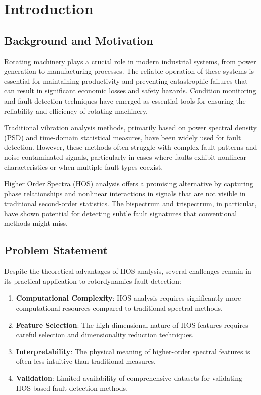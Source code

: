 
\chapter{Introduction}

\section{Background and Motivation}

Rotating machinery plays a crucial role in modern industrial systems, from power generation to manufacturing processes. The reliable operation of these systems is essential for maintaining productivity and preventing catastrophic failures that can result in significant economic losses and safety hazards. Condition monitoring and fault detection techniques have emerged as essential tools for ensuring the reliability and efficiency of rotating machinery.

Traditional vibration analysis methods, primarily based on power spectral density (PSD) and time-domain statistical measures, have been widely used for fault detection. However, these methods often struggle with complex fault patterns and noise-contaminated signals, particularly in cases where faults exhibit nonlinear characteristics or when multiple fault types coexist.

Higher Order Spectra (HOS) analysis offers a promising alternative by capturing phase relationships and nonlinear interactions in signals that are not visible in traditional second-order statistics. The bispectrum and trispectrum, in particular, have shown potential for detecting subtle fault signatures that conventional methods might miss.

\section{Problem Statement}

Despite the theoretical advantages of HOS analysis, several challenges remain in its practical application to rotordynamics fault detection:

\begin{enumerate}
    \item \textbf{Computational Complexity}: HOS analysis requires significantly more computational resources compared to traditional spectral methods.
    \item \textbf{Feature Selection}: The high-dimensional nature of HOS features requires careful selection and dimensionality reduction techniques.
    \item \textbf{Interpretability}: The physical meaning of higher-order spectral features is often less intuitive than traditional measures.
    \item \textbf{Validation}: Limited availability of comprehensive datasets for validating HOS-based fault detection methods.
\end{enumerate}

